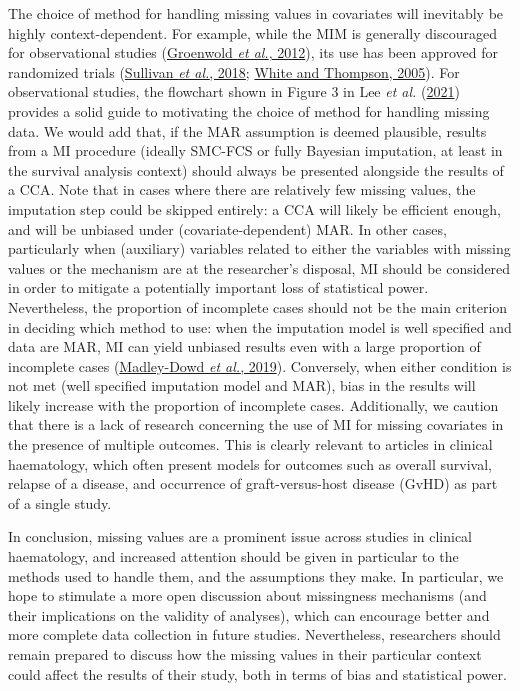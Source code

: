 \documentclass[
  letterpaper,
  DIV=11,
  numbers=noendperiod]{scrreprt}
\begin{document}
The choice of method for handling missing values in covariates will
inevitably be highly context-dependent. For example, while the MIM is
generally discouraged for observational studies
(\protect\hyperlink{ref-groenwoldMissingCovariateData2012}{Groenwold
\emph{et al.}, 2012}), its use has been approved for randomized trials
(\protect\hyperlink{ref-sullivanShouldMultipleImputation2018}{Sullivan
\emph{et al.}, 2018};
\protect\hyperlink{ref-whiteAdjustingPartiallyMissing2005}{White and
Thompson, 2005}). For observational studies, the flowchart shown in
Figure 3 in Lee \emph{et al.}
(\protect\hyperlink{ref-leeFrameworkTreatmentReporting2021}{2021})
provides a solid guide to motivating the choice of method for handling
missing data. We would add that, if the MAR assumption is deemed
plausible, results from a MI procedure (ideally SMC-FCS or fully
Bayesian imputation, at least in the survival analysis context) should
always be presented alongside the results of a CCA. Note that in cases
where there are relatively few missing values, the imputation step could
be skipped entirely: a CCA will likely be efficient enough, and will be
unbiased under (covariate-dependent) MAR. In other cases, particularly
when (auxiliary) variables related to either the variables with missing
values or the mechanism are at the researcher's disposal, MI should be
considered in order to mitigate a potentially important loss of
statistical power. Nevertheless, the proportion of incomplete cases
should not be the main criterion in deciding which method to use: when
the imputation model is well specified and data are MAR, MI can yield
unbiased results even with a large proportion of incomplete cases
(\protect\hyperlink{ref-madley-dowdProportionMissingData2019}{Madley-Dowd
\emph{et al.}, 2019}). Conversely, when either condition is not met
(well specified imputation model and MAR), bias in the results will
likely increase with the proportion of incomplete cases. Additionally,
we caution that there is a lack of research concerning the use of MI for
missing covariates in the presence of multiple outcomes. This is clearly
relevant to articles in clinical haematology, which often present models
for outcomes such as overall survival, relapse of a disease, and
occurrence of graft-versus-host disease (GvHD) as part of a single
study.

In conclusion, missing values are a prominent issue across studies in
clinical haematology, and increased attention should be given in
particular to the methods used to handle them, and the assumptions they
make. In particular, we hope to stimulate a more open discussion about
missingness mechanisms (and their implications on the validity of
analyses), which can encourage better and more complete data collection
in future studies. Nevertheless, researchers should remain prepared to
discuss how the missing values in their particular context could affect
the results of their study, both in terms of bias and statistical power.
\end{document}
